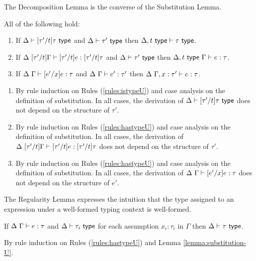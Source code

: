 The Decomposition Lemma is the converse of the Substitution Lemma.
\begin{lemma}[Decomposition]\label{lemma:decomposition-U} All of the following hold:
\begin{enumerate}
\item If $\Delta \vdash [\tau'/t]\tau~\mathsf{type}$ and $\Delta \vdash \tau'~\mathsf{type}$ then $\Delta, t~\mathsf{type} \vdash \tau~\mathsf{type}$.
\item If $\Delta~[\tau'/t]\Gamma \vdash [\tau'/t]e : [\tau'/t]\tau$ and $\Delta \vdash \tau'~\mathsf{type}$ then $\Delta, t~\mathsf{type}~\Gamma \vdash e : \tau$.
\item If $\Delta~\Gamma \vdash [e'/x]e : \tau$ and $\Delta~\Gamma \vdash e' : \tau'$ then $\Delta~\Gamma, x : \tau' \vdash e : \tau$.
\end{enumerate}\end{lemma}
\begin{proof-sketch}
\begin{enumerate}
\item By rule induction on Rules (\ref{rules:istypeU}) and case analysis on the definition of substitution. In all cases, the derivation of $\Delta \vdash [\tau'/t]\tau~\mathsf{type}$ does not depend on the structure of $\tau'$.
\item By rule induction on Rules (\ref{rules:hastypeU}) and case analysis on the definition of substitution. In all cases, the derivation of $\Delta~[\tau'/t]\Gamma \vdash [\tau'/t]e : [\tau'/t]\tau$ does not depend on the structure of $\tau'$.
\item By rule induction on Rules (\ref{rules:hastypeU}) and case analysis on the definition of substitution. In all cases, the derivation of $\Delta~\Gamma \vdash [e'/x]e : \tau$ does not depend on the structure of $e'$.
\end{enumerate}
\end{proof-sketch}

The Regularity Lemma expresses the intuition that the type assigned to an expression under a well-formed typing context is well-formed. 
\begin{lemma}[Regularity]\label{lemma:regularity-U} If $\Delta~\Gamma \vdash e : \tau$ and $\Delta \vdash \tau_i~\mathsf{type}$ for each assumption $x_i : \tau_i$ in $\Gamma$ then $\Delta \vdash \tau~\mathsf{type}$.\end{lemma}
\begin{proof-sketch}
By rule induction on Rules (\ref{rules:hastypeU}) and Lemma \ref{lemma:substitution-U}.
\end{proof-sketch}
